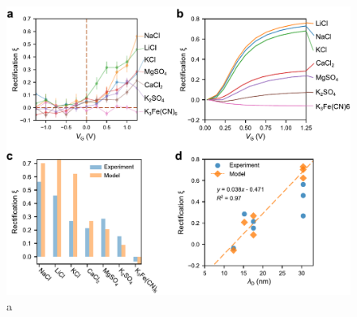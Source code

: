 \documentclass[manuscript=letter, email=true, hyperref=true, keywords=false]{achemso}
\begin{document}
\begin{figure}[htbp]
  \centering
  \includegraphics[width=0.9\linewidth]{img/fig6.pdf}
  \caption{a}
  \label{fig:6}
\end{figure}
\end{document}

